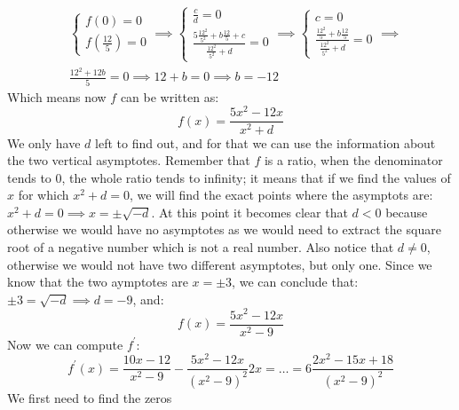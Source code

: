 \begin{equation*}
    \begin{split}
        &\begin{cases}
            f(0) = 0\\
            f\left( \frac{12}{5} \right) = 0
        \end{cases}
        \implies
        \begin{cases}
            \frac{c}{d} = 0\\
            \frac{5\frac{12^2}{5^2} + b\frac{12}{5} + c}{\frac{12^2}{5^2} + d} = 0
        \end{cases}
        \implies
        \begin{cases}
            c = 0\\
            \frac{\frac{12^2}{5} + b\frac{12}{5}}{\frac{12^2}{5^2} + d} = 0
        \end{cases}
        \implies\\
        &\frac{12^2 + 12b}{5} = 0 \implies
        12 + b = 0 \implies
        b = -12
    \end{split}
\end{equation*}
Which means now $f$ can be written as:
\begin{equation*}
    f(x) = \frac{5x^2 - 12x}{x^2 + d}
\end{equation*}
We only have $d$ left to find out, and for that we can use the information about
the two vertical asymptotes. Remember that $f$ is a ratio, when the denominator
tends to 0, the whole ratio tends to infinity; it means that if we find the
values of $x$ for which $x^2 + d = 0$, we will find the exact points where
the asymptots are: $x^2 + d = 0 \implies x = \pm \sqrt{-d}$. At this point
it becomes clear that $d < 0$ because otherwise we would have no asymptotes as
we would need to extract the square root of a negative number which is not a
real number.
Also notice that $d \neq 0$, otherwise we would not have two different
asymptotes, but only one. Since we know that the two aymptotes are $x = \pm 3$,
we can conclude that: $\pm 3 = \sqrt{-d} \implies d = -9$, and:
\begin{equation*}
    f(x) = \frac{5x^2 - 12x}{x^2 - 9}
\end{equation*}
Now we can compute $f^\prime$:
\begin{equation*}
    f^\prime(x) = \frac{10x - 12}{x^2 - 9} - \frac{5x^2 - 12x}{(x^2 - 9)^2} 2x = \dots =
        6\frac{2x^2 - 15x + 18}{(x^2 - 9)^2}
\end{equation*}
We first need to find the zeros
